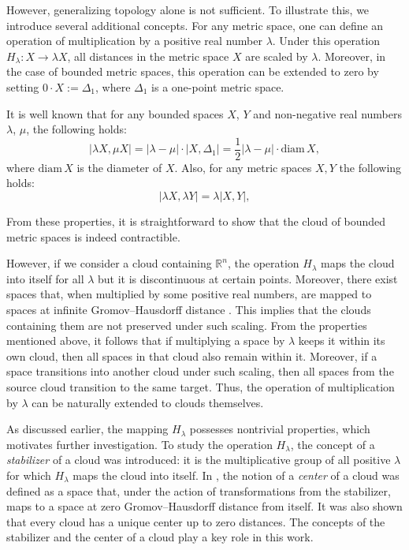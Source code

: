 However, generalizing topology alone is not sufficient. To illustrate
this, we introduce several additional concepts.
For any metric space, one can define an operation of multiplication
by a positive real number $\lambda$. Under this operation
$H_{\lambda}\colon X \to \lambda X$, all distances in the metric
space $X$ are scaled by $\lambda$. Moreover, in the case of bounded
metric spaces, this operation can be extended to zero by setting $0
\cdot X := \Delta_1$, where $\Delta_1$ is a one-point metric space.

It is well known that for any bounded spaces $X$, $Y$ and
non-negative real numbers $\lambda$, $\mu$, the following holds:
$$
|\lambda X, \mu X| = |\lambda - \mu| \cdot |X, \Delta_1| =
\frac{1}{2} |\lambda - \mu| \cdot \text{diam}\, X,
$$
where $\text{diam}\, X$ is the diameter of $X$. Also, for any metric
spaces $X,Y$ the following holds:
$$
|\lambda X, \lambda Y| = \lambda |X, Y|,
$$

From these properties, it is straightforward to show that the cloud
of bounded metric spaces is indeed contractible.

However, if we consider a cloud containing $\mathbb{R}^n$, the
operation $H_\lambda$ maps the cloud into itself for all $\lambda$
but it is discontinuous at certain points. Moreover, there exist
spaces that, when multiplied by some positive real numbers, are
mapped to spaces at infinite Gromov--Hausdorff distance
\cite{TuzhBog1}. This implies that the clouds containing them are not
preserved under such scaling.
From the properties mentioned above, it follows that if multiplying a
space by $\lambda$ keeps it within its own cloud, then all spaces in
that cloud also remain within it. Moreover, if a space transitions
into another cloud under such scaling, then all spaces from the
source cloud transition to the same target. Thus, the operation of
multiplication by $\lambda$ can be naturally extended to clouds themselves.

As discussed earlier, the mapping $H_\lambda$ possesses nontrivial
properties, which motivates further investigation. To study the
operation $H_\lambda$, the concept of a \emph{stabilizer} of a cloud
was introduced: it is the multiplicative group of all positive
$\lambda$ for which $H_\lambda$ maps the cloud into itself. In
\cite{TuzhBog2}, the notion of a \emph{center} of a cloud was defined
as a space that, under the action of transformations from the
stabilizer, maps to a space at zero Gromov--Hausdorff distance from
itself. It was also shown that every cloud has a unique center up to
zero distances. The concepts of the stabilizer and the center of a
cloud play a key role in this work.

